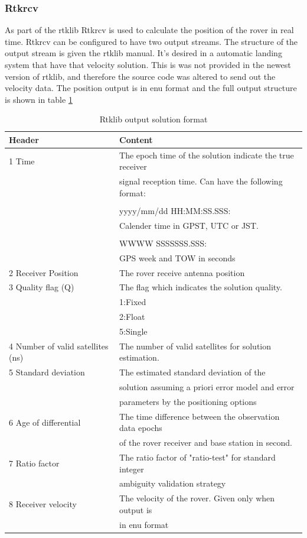 \subsubsection{Rtkrcv}
As part of the \gls{rtklib} Rtkrcv is  used to calculate the position of the rover in real time.
Rtkrcv can be configured to have two output streams. The structure of the output stream is given the \gls{rtklib} manual\citep{Rtklib242}. It's desired in a automatic landing system that have that velocity solution. This is was not provided in the newest version of \gls{rtklib}, and therefore the source code was altered to send out the velocity data. The position output is in \gls{enu} format and the full output structure is shown in table \ref{Tb:RtklibOutput}
\begin{table}[H]
\begin{center}
    \begin{tabular}{ | l | l |}
    \hline
    \textbf{Header} & \textbf{Content} \\ \hline
     1 Time & The epoch time of the solution indicate the true receiver\\& signal reception time. Can have the following format:\\&\\& yyyy/mm/dd HH:MM:SS.SSS:\\& Calender time in GPST, UTC or JST.\\&\\&
     
     WWWW SSSSSSS.SSS:\\&
     GPS week and TOW in seconds  \\ \hline
     2 Receiver Position & The rover receive antenna position \\ \hline
     3 Quality flag (Q) & The flag which indicates the solution quality.\\& 1:Fixed\\& 2:Float\\& 5:Single \\ \hline
     4 Number of valid satellites (ns) & The number of valid satellites for solution estimation. \\ \hline
     5 Standard deviation & The estimated standard deviation of the\\& solution assuming a priori error model and error\\& parameters by the positioning options \\ \hline
     6 Age of differential & The time difference between the observation data epochs\\& of the rover receiver and base station in second. \\ \hline
     7 Ratio factor & The ratio factor of "ratio-test" for standard integer\\& ambiguity validation strategy \\ \hline
     8 Receiver velocity & The velocity of the rover. Given only when output is\\& in enu format \\ \hline
    \end{tabular}
\end{center}
\caption{Rtklib output solution format }
\label{Tb:RtklibOutput}
\end{table}
